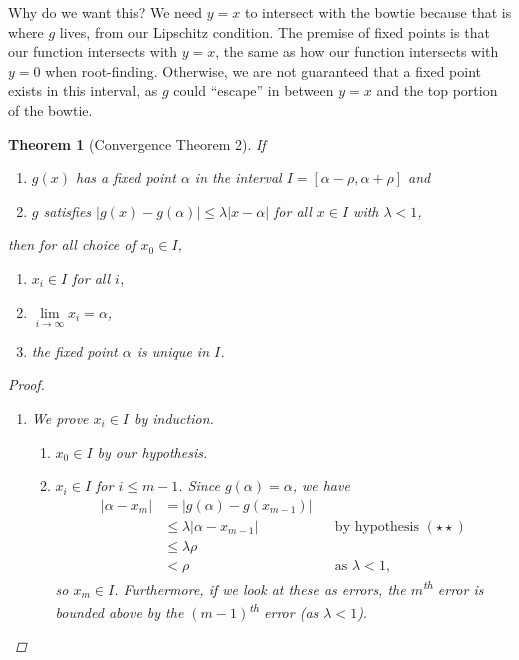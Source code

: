 \documentclass[12pt,letterpaper,DIV=11]{scrartcl}
\theoremstyle{plain}
\newtheorem{theorem}{Theorem}[section]
\theoremstyle{definition}
\theoremstyle{remark}
\begin{document}
  Why do we want this?
  We need $y = x$ to intersect with the bowtie because that is where $g$ lives, from our Lipschitz condition.
  The premise of fixed points is that our function intersects with $y = x$, the same as how our function intersects with $y = 0$ when root-finding.
  Otherwise, we are not guaranteed that a fixed point exists in this interval, as $g$ could \enquote{escape} in between $y = x$ and the top portion of the bowtie.

  \begin{theorem}[Convergence Theorem 2]\label{thm:convergence2}
    If \begin{enumerate}
      \item[$(\star)$] $g(x)$ has a fixed point $\alpha$ in the interval $I = [\alpha - \rho, \alpha + \rho]$ and
      \item[$(\star\star)$] $g$ satisfies $|g(x) - g(\alpha)| \leq \lambda |x - \alpha|$ for all $x \in I$ with $\lambda < 1$,
      \end{enumerate} then for all choice of $x_0 \in I$, \begin{enumerate}
      \item $x_i \in I$ for all $i$,
      \item $\lim\limits_{i \to \infty} x_i = \alpha$,
      \item the fixed point $\alpha$ is unique in $I$.
    \end{enumerate}
    \begin{proof}\leavevmode
      \begin{enumerate}
        \item We prove $x_i \in I$ by induction. \begin{enumerate}
          \item $x_0 \in I$ by our hypothesis.
          \item $x_i \in I$ for $i \leq m - 1$.
            Since $g(\alpha) = \alpha$, we have \begin{align*}
              |\alpha - x_m| &= |g(\alpha) - g(x_{m - 1})| \\
                             &\leq \lambda |\alpha - x_{m - 1}| && \text{by hypothesis $(\star\star)$} \\
                             &\leq \lambda \rho \\
                             &< \rho && \text{as $\lambda < 1$},
            \end{align*} so $x_m \in I$.
            Furthermore, if we look at these as errors, the $m$\textsuperscript{th} error is bounded above by the $(m - 1)$\textsuperscript{th} error (as $\lambda < 1$).
        \end{enumerate}


\end{enumerate}
\end{proof}
\end{theorem}
\end{document}

